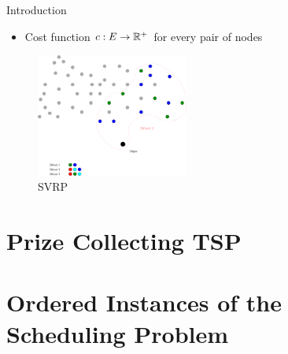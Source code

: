 \begin{frame}[t, allowframebreaks]{Introduction}
\begin{minipage}[t]{0.48\textwidth}
\begin{itemize}
            \item Cost function $c:E \rightarrow \mathbb{R}^+$ for every pair of nodes
        \end{itemize}
    \end{minipage}
    \begin{minipage}[t]{0.48\textwidth}
        \begin{figure}
            \centering
            \includegraphics[width=5cm]{VRPSS02.pdf}
            \caption{SVRP}
            \label{fig:my_label}
        \end{figure}            
    \end{minipage}    
\end{frame}

\section{Prize Collecting TSP}
\frame{\insertsection}

\section{Ordered Instances of the Scheduling Problem}
\frame{\insertsection}



